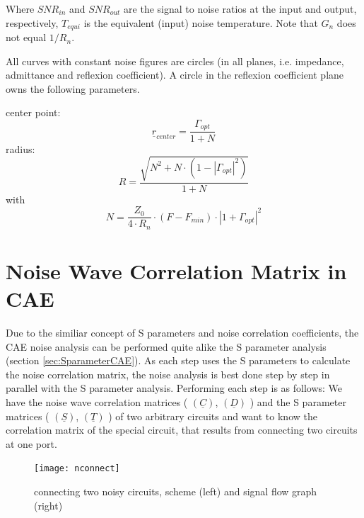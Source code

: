 \documentclass[10pt]{report}
\begin{document}
Where $SNR_{in}$ and $SNR_{out}$ are the signal to noise ratios at the
input and output, respectively, $T_{equi}$ is the equivalent (input)
noise temperature.  Note that $G_n$ does not equal $1/R_n$.

\addvspace{12pt}

All curves with constant noise figures are circles (in all planes,
i.e. impedance, admittance and reflexion coefficient).  A circle in
the reflexion coefficient plane owns the following parameters.

\addvspace{12pt}

center point:
\begin{equation}
\underline{r}_{center} = \frac{\Gamma_{opt}}{1+N}
\end{equation}
radius:
\begin{equation}
R = \frac{\sqrt{N^2 + N\cdot(1-|\Gamma_{opt}|^2)}}{1+N}
\end{equation}
with
\begin{equation}
N = \frac{Z_0}{4\cdot R_n}\cdot (F-F_{min})\cdot |1+\Gamma_{opt}|^2
\end{equation}


\section{Noise Wave Correlation Matrix in CAE}

Due to the similiar concept of S parameters and noise correlation
coefficients, the CAE noise analysis can be performed quite alike
the S parameter analysis (section \ref{sec:SparameterCAE}). As each
step uses the S parameters to calculate the noise correlation matrix,
the noise analysis is best done step by step in parallel with the
S parameter analysis. Performing each step is as follows:
We have the noise wave correlation matrices ( $(\underline{C})$,
$(\underline{D})$ ) and the S parameter matrices ( $(\underline{S})$,
$(\underline{T})$ ) of two arbitrary circuits and want to know the
correlation matrix of the special circuit, that results from
connecting two circuits at one port.\\


\begin{figure}[ht]
\begin{center}
\texttt{[image: nconnect]}
\end{center}
\caption{connecting two noisy circuits, scheme (left) and signal flow graph (right)}
\label{fig:nconnect}
\end{figure}
\FloatBarrier
\end{document}
